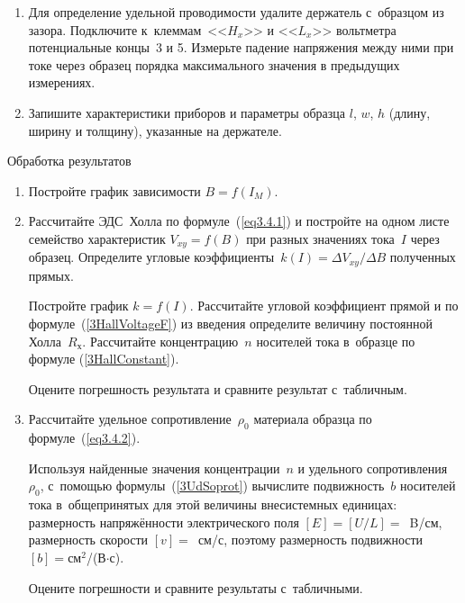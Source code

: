 \begin{enumerate}
{Зарисуйте в тетради образец. Укажите на рисунке направления тока, магнитного поля и отклонение носителей. По знаку
($\pm$) на клеммах цифрового вольтметра определите характер проводимости.
}
\item{Для определение удельной проводимости удалите держатель с~образцом из зазора. Подключите к~клеммам~<<$H_{x}$>> и <<$L_{x}$>> вольтметра потенциальные концы~3 и 5. Измерьте падение напряжения между ними при токе через образец порядка максимального значения в предыдущих измерениях.}

\item{ Запишите характеристики приборов и параметры образца $l$, $w$, $h$ (длину, ширину и толщину), указанные на держателе.}
\end{enumerate}

{\rm Обработка результатов}
\begin{enumerate}

\item {Постройте график зависимости $B=f(I_{M})$.}

\item{ Рассчитайте ЭДС~Холла по формуле~(\ref{eq3.4.1}) и постройте на одном листе семейство характеристик $V_{xy}=f(B)$ при разных значениях тока~$I$ через образец. Определите угловые коэффициенты~$k(I)=\Delta{V_{xy}}/\Delta B$ полученных прямых.

Постройте график $k=f(I)$. Рассчитайте угловой коэффициент прямой и по формуле~(\ref{3HallVoltageF})  из введения определите величину постоянной Холла~$R_{х}$. Рассчитайте концентрацию~$n$ носителей тока в~образце по формуле (\ref{3HallConstant}).

Оцените погрешность результата и сравните результат с~табличным.}


\item{ Рассчитайте удельное сопротивление~$\rho_{0}$ материала образца по формуле~(\ref{eq3.4.2}).

Используя найденные значения концентрации~$n$ и удельного сопротивления~$\rho_0$, с~помощью формулы~(\ref{3UdSoprot}) вычислите подвижность~$b$ носителей тока в~общепринятых для этой величины внесистемных единицах: размерность напряжённости электрического поля $[E]=[U/L]=$~B/см, размерность скорости $[v]=$~см/с, поэтому размерность
подвижности~$[b]=$см$^2$/(В$\cdot$с).

Оцените погрешности и сравните результаты с~табличными.}
\end{enumerate}

